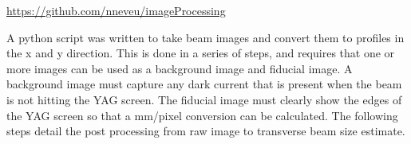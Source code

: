 \url{https://github.com/nneveu/imageProcessing}


A python script was written to take beam images and convert them to profiles in the x and y direction.
This is done in a series of steps, and requires that one or more images can be used as a 
background image and fiducial image. A background image must capture any dark current 
that is present when the beam is not hitting the YAG screen. The fiducial image must 
clearly show the edges of the YAG screen so that a mm/pixel conversion can be calculated.
The following steps detail the post processing from raw image to transverse beam size estimate.







